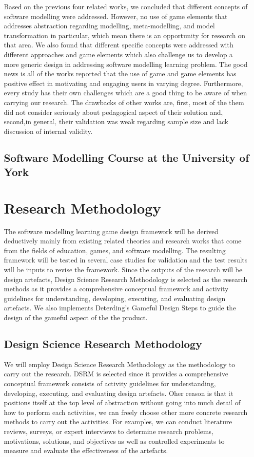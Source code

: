 \documentclass[a4paper]{Report}
\begin{document}
Based on the previous four related works, we concluded that different concepts of software modelling were addressed. However, no use of game elements that addresses abstraction regarding modelling, meta-modelling, and model transformation in particular, which mean there is an opportunity for research on that area. We also found that different specific concepts were addressed with different approaches and game elements which also challenge us to develop a more generic design in addressing software modelling learning problem. The good news is all of the works reported that the use of game and game elements has positive effect in motivating and engaging users in varying degree. Furthermore, every study has their own challenges which are a good thing to be aware of when carrying our research. The drawbacks of other works are, first, most of the them did not consider seriously about pedagogical aspect of their solution and, second,in general, their validation was weak regarding sample size and lack discussion of internal validity.


\subsection{Software Modelling Course at the University of York}

\section{Research Methodology}
The software modelling learning game design framework will be derived deductively mainly from existing related theories and research works that come from the fields of education, games, and software modelling. The resulting framework will be tested in several case studies for validation and the test results will be inputs to revise the framework. Since the outputs of the research will be design artefacts, Design Science Research Methodology \cite{peffers2007design} is selected as the research methods as it provides a comprehensive conceptual framework and activity guidelines for understanding, developing, executing, and evaluating design artefacts. We also implements Deterding's Gameful Design Steps \cite{deterding2015lens} to guide the design of the gameful aspect of the the product.

\subsection{Design Science Research Methodology}
We will employ Design Science Research Methodology \cite{peffers2007design} as the methodology to carry out the research. DSRM is selected since it provides a comprehensive conceptual framework consists of activity guidelines for understanding, developing, executing, and evaluating design artefacts. Oher reason is that it positions itself at the top level of abstraction without going into much detail of how to perform each activities, we can freely choose other more concrete research methods to carry out the activities. For examples, we can conduct literature reviews, surveys, or expert interviews to determine research problems, motivations, solutions, and objectives as well as controlled experiments to measure and evaluate the effectiveness of the artefacts. 
\end{document}
